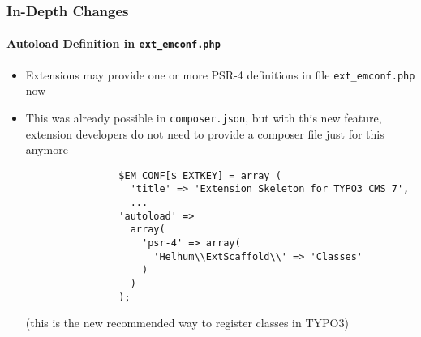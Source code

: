 \begin{frame}[fragile]
	\frametitle{In-Depth Changes}
	\framesubtitle{Autoload Definition in \texttt{ext\_emconf.php}}

	\lstset{basicstyle=\tiny\ttfamily}

	\begin{itemize}

		\item Extensions may provide one or more PSR-4 definitions in file \texttt{ext\_emconf.php} now

		\item This was already possible in \texttt{composer.json}, but with this new feature,
			extension developers do not need to provide a composer file just for this anymore

			\begin{lstlisting}
				$EM_CONF[$_EXTKEY] = array (
				  'title' => 'Extension Skeleton for TYPO3 CMS 7',
				  ...
				'autoload' =>
				  array(
				    'psr-4' => array(
				      'Helhum\\ExtScaffold\\' => 'Classes'
				    )
				  )
				);
			\end{lstlisting}

			\small
				(this is the new recommended way to register classes in TYPO3)
			\normalsize

	\end{itemize}

\end{frame}


